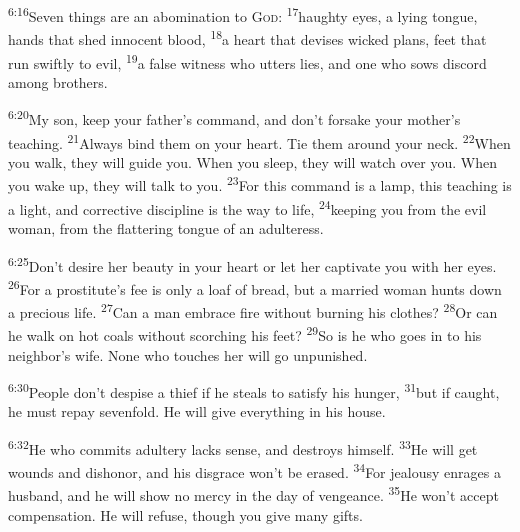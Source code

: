 \documentclass[openany,12pt,english]{book}
\newenvironment{para}{\par\pretolerance=100\tolerance=200\setlength{\emergencystretch}{0.6em}\relax}{\par}
\begin{document}
\begin{para}
    \textsuperscript{6:16}\thinspace{}Sev\-en things are an a\-bom\-i\-na\-tion to \textsc{God}:
    \textsuperscript{17}\thinspace{}haugh\-ty eyes, a ly\-ing tongue, hands that shed in\-no\-cent blood,
    \textsuperscript{18}\thinspace{}a heart that devises wick\-ed plans, feet that run swift\-ly to evil,
    \textsuperscript{19}\thinspace{}a false wit\-ness who utters lies, and one who sows dis\-cord a\-mong brothers.
\end{para}

\begin{para}
    \textsuperscript{6:20}\thinspace{}My son, keep your father's com\-mand, and don't for\-sake your mother's teach\-ing.
    \textsuperscript{21}\thinspace{}Al\-ways bind them on your heart. Tie them a\-round your neck.
    \textsuperscript{22}\thinspace{}When you walk, they will guide you. When you sleep, they will watch over you. When you wake up, they will talk to you.
    \textsuperscript{23}\thinspace{}For this com\-mand is a lamp, this teach\-ing is a light, and cor\-rec\-tive dis\-ci\-pline is the way to life,
    \textsuperscript{24}\thinspace{}keep\-ing you from the evil wom\-an, from the flattering tongue of an a\-dul\-ter\-ess.
\end{para}

\begin{para}
    \textsuperscript{6:25}\thinspace{}Don't de\-sire her beau\-ty in your heart or let her cap\-ti\-vate you with her eyes.
    \textsuperscript{26}\thinspace{}For a prostitute's fee is on\-ly a loaf of bread, but a mar\-ried wom\-an hunts down a pre\-cious life.
    \textsuperscript{27}\thinspace{}Can a man em\-brace fire with\-out burn\-ing his clothes?
    \textsuperscript{28}\thinspace{}Or can he walk on hot coals with\-out scorching his feet?
    \textsuperscript{29}\thinspace{}So is he who goes in to his neighbor's wife. None who touches her will go un\-pun\-ished.
\end{para}

\begin{para}
    \textsuperscript{6:30}\thinspace{}Peo\-ple don't de\-spise a thief if he steals to sat\-is\-fy his hun\-ger,
    \textsuperscript{31}\thinspace{}but if caught, he must re\-pay sev\-en\-fold. He will give eve\-ry\-thing in his house.
\end{para}

\begin{para}
    \textsuperscript{6:32}\thinspace{}He who commits a\-dul\-ter\-y lacks sense, and destroys him\-self.
    \textsuperscript{33}\thinspace{}He will get wounds and dis\-hon\-or, and his dis\-grace won't be e\-rased.
    \textsuperscript{34}\thinspace{}For jeal\-ous\-y enrages a hus\-band, and he will show no mer\-cy in the day of venge\-ance.
    \textsuperscript{35}\thinspace{}He won't ac\-cept com\-pen\-sa\-tion. He will re\-fuse, though you give man\-y gifts.
\end{para}
\end{document}
